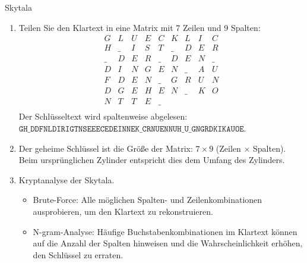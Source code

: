 \documentclass{article}
\begin{document}
\begin{exercise}{Skytala}
  \begin{solution}
    \begin{enumerate}
        \item Teilen Sie den Klartext in eine Matrix mit 7 Zeilen und 9 Spalten:
          \[
            \begin{array}{ccccccccc}
            G & L & U & E & C & K & L & I & C \\
            H & \_ & I & S & T & \_ & D & E & R \\
            \_ & D & E & R & \_ & D & E & N & \_ \\
            D & I & N & G & E & N & \_ & A & U \\
            F & D & E & N & \_ & G & R & U & N \\
            D & G & E & H & E & N & \_ & K & O \\
            N & T & T & E & \_ & & & & \\
            \end{array}
          \]
          Der Schlüsseltext wird spaltenweise abgelesen: $\texttt{GH\_DDFNLDIRIGTNSEEECEDEINNEK\_CRNUENNUH\_U\_GNGRDKIKAUOE}$.
        \item Der geheime Schlüssel ist die Größe der Matrix: $7\times9$ (Zeilen $\times$ Spalten). Beim ursprünglichen Zylinder entspricht dies dem Umfang des Zylinders.
        \item Kryptanalyse der Skytala.
          \begin{itemize}
              \item Brute-Force: Alle möglichen Spalten- und Zeilenkombinationen ausprobieren, um den Klartext zu rekonstruieren.
              \item N-gram-Analyse: Häufige Buchstabenkombinationen im Klartext können auf die Anzahl der Spalten hinweisen und die Wahrscheinlichkeit erhöhen, den Schlüssel zu erraten.
          \end{itemize}
    \end{enumerate}
  \end{solution}
\end{exercise}
\end{document}
